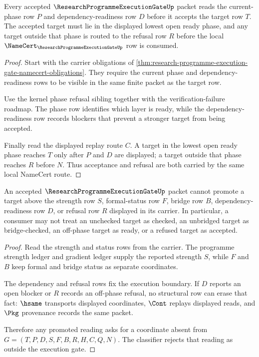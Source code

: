 \begin{theorem}
\label{thm:research-programme-execution-gate-lowest-open-layer-readiness}
Every accepted $\ResearchProgrammeExecutionGateUp$ packet reads the current-phase row $P$ and dependency-readiness row $D$ before it accepts the target row $T$. The accepted target must lie in the displayed lowest open ready phase, and any target outside that phase is routed to the refusal row $R$ before the local $\NameCert_{\ResearchProgrammeExecutionGateUp}$ row is consumed.
\end{theorem}
\begin{proof}
Start with the carrier obligations of \autoref{thm:research-programme-execution-gate-namecert-obligations}. They require the current phase and dependency-readiness rows to be visible in the same finite packet as the target row.

Use the kernel phase refusal sibling together with the verification-failure roadmap. The phase row identifies which layer is ready, while the dependency-readiness row records blockers that prevent a stronger target from being accepted.

Finally read the displayed replay route $C$. A target in the lowest open ready phase reaches $T$ only after $P$ and $D$ are displayed; a target outside that phase reaches $R$ before $N$. Thus acceptance and refusal are both carried by the same local NameCert route.
\end{proof}

\begin{theorem}
\label{thm:research-programme-execution-gate-noninflation-boundary}
An accepted $\ResearchProgrammeExecutionGateUp$ packet cannot promote a target above the strength row $S$, formal-status row $F$, bridge row $B$, dependency-readiness row $D$, or refusal row $R$ displayed in its carrier. In particular, a consumer may not treat an unchecked target as checked, an unbridged target as bridge-checked, an off-phase target as ready, or a refused target as accepted.
\end{theorem}
\begin{proof}
Read the strength and status rows from the carrier. The programme strength ledger and gradient ledger supply the reported strength $S$, while $F$ and $B$ keep formal and bridge status as separate coordinates.

The dependency and refusal rows fix the execution boundary. If $D$ reports an open blocker or $R$ records an off-phase refusal, no structural row can erase that fact: $\hsame$ transports displayed coordinates, $\Cont$ replays displayed reads, and $\Pkg$ provenance records the same packet.

Therefore any promoted reading asks for a coordinate absent from $G=(T,P,D,S,F,B,R,H,C,Q,N)$. The classifier rejects that reading as outside the execution gate.
\end{proof}

